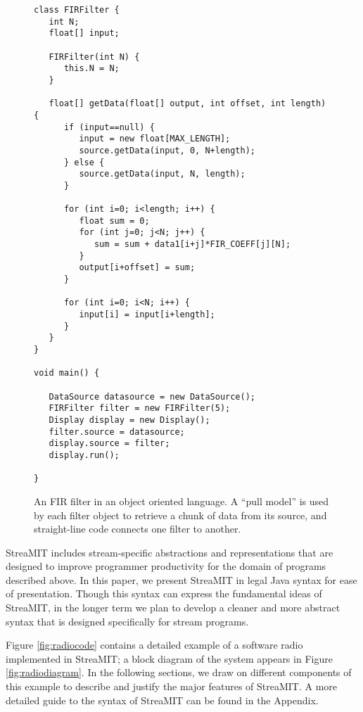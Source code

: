 \begin{figure}[t]
\scriptsize
\begin{verbatim}
class FIRFilter {
   int N;
   float[] input;

   FIRFilter(int N) {
      this.N = N;
   }

   float[] getData(float[] output, int offset, int length) {
      if (input==null) {
         input = new float[MAX_LENGTH];
         source.getData(input, 0, N+length);
      } else {
         source.getData(input, N, length);
      }

      for (int i=0; i<length; i++) {
         float sum = 0;
         for (int j=0; j<N; j++) {
            sum = sum + data1[i+j]*FIR_COEFF[j][N];
         }
         output[i+offset] = sum;
      }

      for (int i=0; i<N; i++) {
         input[i] = input[i+length];
      }
   }
}

void main() {

   DataSource datasource = new DataSource();
   FIRFilter filter = new FIRFilter(5);
   Display display = new Display();
   filter.source = datasource;
   display.source = filter;
   display.run();

}
\end{verbatim}
\vspace{-12pt}
\caption{\protect\small An FIR filter in an object oriented language.
A ``pull model'' is used by each filter object to retrieve a chunk of
data from its source, and straight-line code connects one filter to
another.
\protect\label{fig:firobject}}
\vspace{-12pt}
\end{figure}

StreaMIT includes stream-specific abstractions and representations
that are designed to improve programmer productivity for the domain of
programs described above.  In this paper, we present StreaMIT in legal
Java syntax for ease of presentation.  Though this syntax can express
the fundamental ideas of StreaMIT, in the longer term we plan to
develop a cleaner and more abstract syntax that is designed
specifically for stream programs.

Figure \ref{fig:radiocode} contains a detailed example of a software
radio implemented in StreaMIT; a block diagram of the system appears
in Figure \ref{fig:radiodiagram}.  In the following sections, we draw
on different components of this example to describe and justify the
major features of StreaMIT.  A more detailed guide to the syntax of
StreaMIT can be found in the Appendix.

